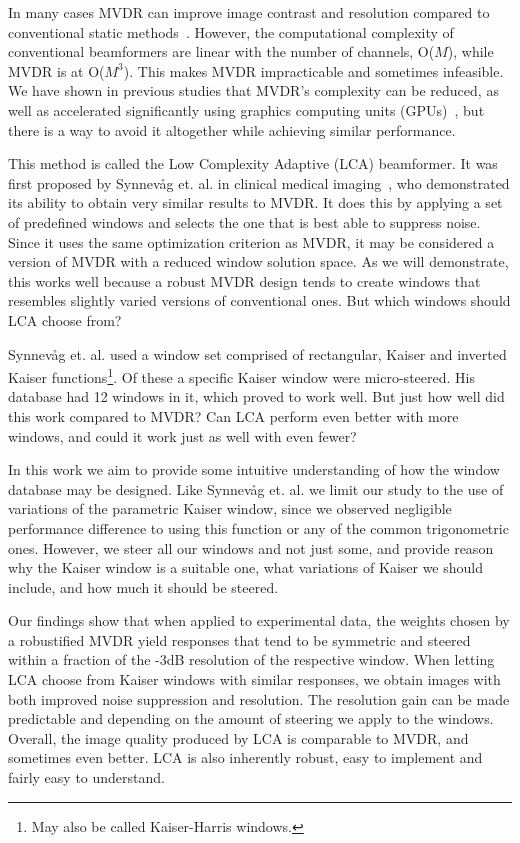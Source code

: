 \documentclass[10pt,journal,draftclsnofoot,onecolumn]{IEEEtran}
\newcommand\1{\vec 1}
\begin{document}
In many cases MVDR can improve image contrast and resolution compared to conventional static methods~\cite{Blomberg2013,Blomberg2012a,Dursun2009,Lo2004}. However, the computational complexity of conventional beamformers are linear with the number of channels, O($M$), while MVDR is at O($M^3$). This makes MVDR impracticable and sometimes infeasible. We have shown in previous studies that MVDR's complexity can be reduced, as well as accelerated significantly using graphics computing units (GPUs)~\cite{Buskenes2014,Asen2013}, but there is a way to avoid it altogether while achieving similar performance.

This method is called the Low Complexity Adaptive (LCA) beamformer. It was first proposed by Synnev\aa{}g et. al. in clinical medical imaging~\cite{Synnevag2008}, who demonstrated its ability to obtain very similar results to MVDR. It does this by applying a set of predefined windows and selects the one that is best able to suppress noise. Since it uses the same optimization criterion as MVDR, it may be considered a version of MVDR with a reduced window solution space. As we will demonstrate, this works well because a robust MVDR design tends to create windows that resembles slightly varied versions of conventional ones. But which windows should LCA choose from?

Synnev\aa{}g et. al. used a window set comprised of rectangular, Kaiser and inverted Kaiser functions\footnote{May also be called Kaiser-Harris windows.}. Of these a specific Kaiser window were micro-steered. His database had 12 windows in it, which proved to work well. But just how well did this work compared to MVDR? Can LCA perform even better with more windows, and could it work just as well with even fewer? 

In this work we aim to provide some intuitive understanding of how the window database may be designed. Like Synnev\aa{}g et. al. we limit our study to the use of variations of the parametric Kaiser window, since we observed negligible performance difference to using this function or any of the common trigonometric ones. However, we steer all our windows and not just some, and provide reason why the Kaiser window is a suitable one, what variations of Kaiser we should include, and how much it should be steered.

Our findings show that when applied to experimental data, the weights chosen by a robustified MVDR yield responses that tend to be symmetric and steered within a fraction of the -3dB resolution of the respective window. When letting LCA choose from Kaiser windows with similar responses, we obtain images with both improved noise suppression and resolution. The resolution gain can be made predictable and depending on the amount of steering we apply to the windows. Overall, the image quality produced by LCA is comparable to MVDR, and sometimes even better. LCA is also inherently robust, easy to implement and fairly easy to understand.
\end{document}
